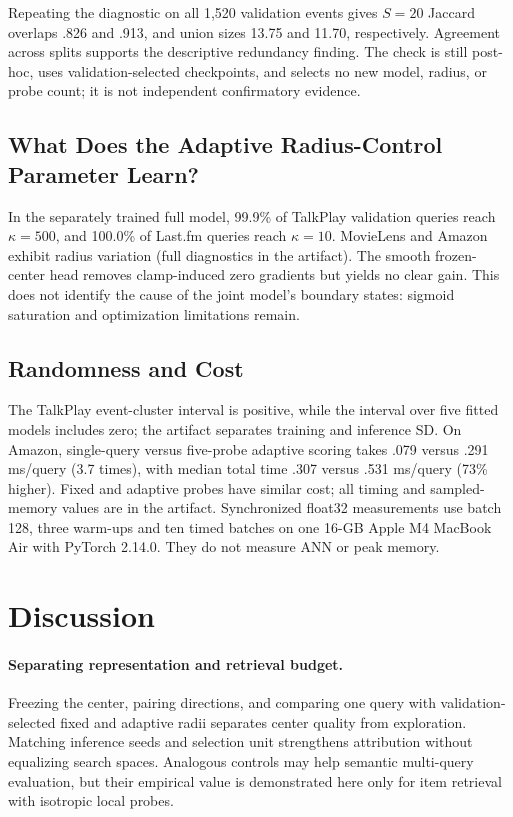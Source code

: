 \documentclass[runningheads]{llncs}
\begin{document}
Repeating the diagnostic on all 1,520 validation events gives $S=20$ Jaccard
overlaps .826 and .913, and union sizes 13.75 and 11.70, respectively.
Agreement across splits supports the descriptive redundancy finding. The check
is still post-hoc, uses validation-selected checkpoints, and selects no new
model, radius, or probe count; it is not independent confirmatory evidence.

\subsection{What Does the Adaptive Radius-Control Parameter Learn?}

In the separately trained full model, 99.9\% of TalkPlay validation queries
reach $\kappa=500$, and 100.0\% of Last.fm queries reach $\kappa=10$.
MovieLens and Amazon exhibit radius variation (full diagnostics in the
artifact). The smooth frozen-center head removes clamp-induced zero gradients
but yields no clear gain. This does not identify the cause of the joint
model's boundary states: sigmoid saturation and optimization limitations remain.

\subsection{Randomness and Cost}

The TalkPlay event-cluster interval is positive, while the interval over five
fitted models includes zero; the artifact separates training and inference SD.
On Amazon, single-query versus five-probe adaptive scoring takes .079 versus
.291 ms/query (3.7 times), with median total time .307 versus .531 ms/query
(73\% higher). Fixed and adaptive probes have similar cost; all timing and
sampled-memory values are in the artifact. Synchronized float32 measurements
use batch 128, three warm-ups and ten timed batches on one 16-GB Apple M4
MacBook Air with PyTorch 2.14.0. They do not measure ANN or peak memory.

\section{Discussion}
\label{sec:discussion}

\paragraph{Separating representation and retrieval budget.}
Freezing the center, pairing directions, and comparing one query with
validation-selected fixed and adaptive radii separates center quality from
exploration. Matching inference seeds and selection unit strengthens attribution
without equalizing search spaces. Analogous controls may help semantic
multi-query evaluation, but their empirical value is demonstrated here only
for item retrieval with isotropic local probes.
\end{document}
